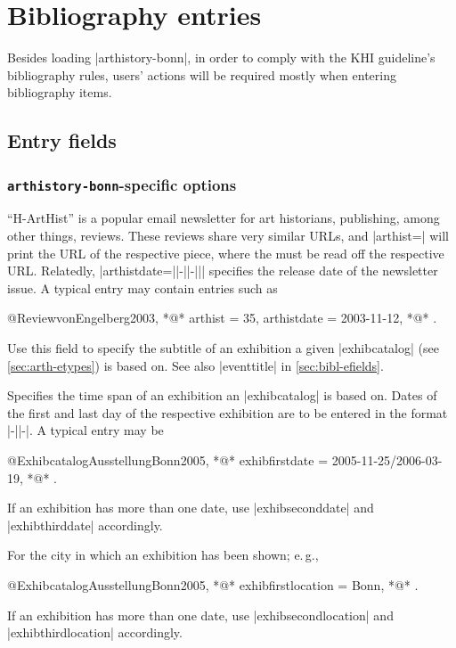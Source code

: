 \documentclass[a4paper,
10pt,
ngerman,
english
]{ltxdoc}
\begin{document}
\section{Bibliography entries}
Besides loading |arthistory-bonn|, in order to comply with the KHI guideline's bibliography rules, users' actions will be required mostly when entering bibliography items.

\subsection{Entry fields}

\subsubsection{\texttt{arthistory-bonn}-specific options}

\enquote{H-ArtHist} is a popular email newsletter for art historians, publishing, among other things, reviews. These reviews share very similar URLs, and |arthist=| will print the URL of the respective piece, where the  must be read off the respective URL.
Relatedly, |arthistdate={||-||-||}| specifies the release date of the newsletter issue. A typical entry may contain entries such as
\begin{code}
@Review{vonEngelberg2003,
  *@\ldots@*
  arthist      = {35},
  arthistdate  = {2003-11-12},
  *@\ldots@*
}.
\end{code}

Use this field to specify the subtitle of an exhibition a given |exhibcatalog| (see \cref{sec:arth-etypes}) is based on. See also |eventtitle| in \cref{sec:bibl-efields}.

Specifies the time span of an exhibition an |exhibcatalog| is based on. Dates of the first and last day of the respective exhibition are to be entered in the format |-||-|. A typical entry may be
\begin{code}
@Exhibcatalog{AusstellungBonn2005,
  *@\ldots@*
  exhibfirstdate = {2005-11-25/2006-03-19},
  *@\ldots@*
}.
\end{code}
If an exhibition has more than one date, use |exhibseconddate| and |exhibthirddate| accordingly.

For the city in which an exhibition has been shown; e.\,g.,
\begin{code}
@Exhibcatalog{AusstellungBonn2005,
  *@\ldots@*
  exhibfirstlocation = {Bonn},
  *@\ldots@*
}.
\end{code}
If an exhibition has more than one date, use |exhibsecondlocation| and |exhibthirdlocation| accordingly.
\end{document}
